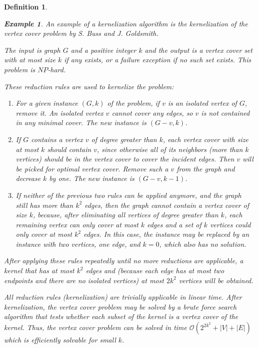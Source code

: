 \documentclass[12pt]{article}
\theoremstyle{slplain}
\newtheorem{defi}{Definition}
\newtheorem{exam}{Example}
\begin{document}
\begin{defi}
\vspace{1cm}
\begin{exam}
An example of a kernelization algorithm is the kernelization of
the vertex cover problem by S. Buss and J. Goldsmith\cite{buss}. 

The input is graph $G$ and a positive integer 
$k$ and the output is a vertex cover set with at most size $k$ if any exists, or
a failure exception if no such set exists. This problem is $NP$-hard. 

These reduction rules are used to kernelize the problem:

\begin{enumerate}
\item For a given instance $(G,k)$ of the problem, if $v$ is an isolated vertex of $G$, remove it. An isolated vertex $v$ cannot cover any edges, so $v$ is not contained in any minimal cover. The new instance is $(G - v , k)$.


\item If $G$ contains a vertex $v$ of degree greater than $k$, each vertex cover with size at most $k$ should contain $v$, since otherwise all of its neighbors (more than $k$ vertices) should be in the vertex cover to cover the incident edges. Then $v$ will be picked for optimal vertex cover. Remove such a $v$ from the graph and decrease $k$ by one. 
The new instance is $(G - v , k - 1)$.

\item If neither of the previous two rules can be applied anymore, and the graph still has more than $k^2$ edges, then the graph cannot contain a vertex cover of size $k$, because, after eliminating all vertices of degree greater than
$k$, each remaining vertex can only cover at most $k$ edges and a set of
$k$ vertices could only cover at most $k^2$ edges. In this case, the instance
may be replaced by an instance with two vertices, one edge, and $k = 0$,
which also has no solution.
\end{enumerate}

After applying these rules repeatedly until no more reductions are applicable, a kernel that has at most $k^2$ edges and (because each edge has at most two endpoints and there are no isolated vertices)  at most $2k^2$ vertices will be obtained. 

All reduction rules (kernelization) are trivially applicable in linear time. After kernelization, the vertex cover problem may be solved by a brute force search algorithm that tests whether each subset of the kernel is a vertex cover of the kernel. Thus, the vertex cover problem can be solved in time $\mathcal{O}(2^{2k^2} + |V| + |E|)$ which is efficiently solvable for small $k$.
\end{exam}


\end{defi}
\end{document}

